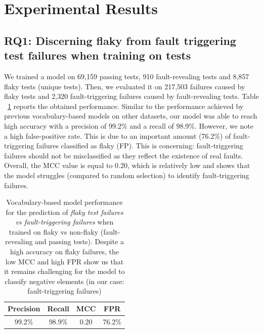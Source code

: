 \section{Experimental Results}
\label{sec:chromium-results}

\subsection{RQ1: Discerning flaky from fault triggering test failures when training on tests}

We trained a model on 69,159 passing tests, 910 fault-revealing tests and 8,857 flaky tests (unique tests).
Then, we evaluated it on 217,503 failures caused by flaky tests and 2,320 fault-triggering failures caused by fault-revealing tests. Table ~\ref{table:rq1} reports the obtained performance. Similar to the performance achieved by previous vocabulary-based models on other datasets, our model was able to reach high accuracy with a precision of 99.2\% and a recall of 98.9\%. However, we note a high false-positive rate. This is due to an important amount (76.2\%) of fault-triggering failures classified as flaky (FP). This is concerning: fault-triggering failures should not be misclassified as they reflect the existence of real faults. Overall, the MCC value is equal to 0.20, which is relatively low and shows that the model struggles (compared to random selection) to identify fault-triggering failures. 

\begin{table}[ht]
\caption{Vocabulary-based model performance for the prediction of \textit{flaky test failures vs fault-triggering failures} when trained on flaky vs non-flaky (fault-revealing and passing tests). Despite a high accuracy on flaky failures, the low MCC and high FPR show us that it remains challenging for the model to classify negative elements (in our case: fault-triggering failures)}
\label{table:rq1}
\centering
\begin{tabular}{c|c|c|c} 
 \toprule
 \textbf{Precision} & \textbf{Recall} & \textbf{MCC} & \textbf{FPR} \\ [0.5ex] 
 \midrule
 99.2\% & 98.9\% & 0.20 & 76.2\% \\ 
 \bottomrule
\end{tabular}
\end{table}

